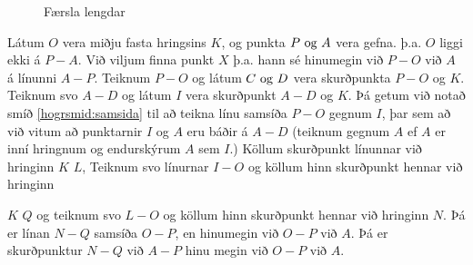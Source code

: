 \begin{frame}
  \begin{figure}[H]
    \centering

    \caption{Færsla lengdar}
    \label{fig:hogrfaerslalengdar}
  \end{figure}
  
\end{frame}

\begin{frame}
  \begin{hogrsmid}[Punktfinnari]\label{hogrsmid:punktfinnari}
    Látum \(O\) vera miðju fasta hringsins \(K\), og punkta \(P \text{ og } A\) vera gefna. þ.a.
    \(O\) liggi ekki á \(P-A\).
    Við viljum finna punkt \(X\) þ.a. hann sé hinumegin við \(P-O\) við \(A\)
    á línunni \(A-P\).
    Teiknum \(P-O\) og látum \(C \text{ og } D\) vera skurðpunkta \(P-O\) og \(K\).
    Teiknum svo \(A-D\) og látum \(I\) vera skurðpunkt \(A-D\) og \(K\).
    Þá getum við notað smíð \ref{hogrsmid:samsida} til
    að teikna línu samsíða \(P-O\) gegnum \(I\), þar sem að við vitum að
    punktarnir \(I\) og \(A\) eru báðir á \(A-D\) (teiknum gegnum \(A\)
    ef \(A\) er inní hringnum og endurskýrum \(A\) sem \(I\).)
    Köllum skurðpunkt línunnar við hringinn \(K\) \(L\),
    Teiknum svo línurnar \(I-O\) og köllum hinn skurðpunkt hennar við hringinn

    \(K\) \(Q\) og teiknum svo \(L-O\) og köllum hinn skurðpunkt hennar við
    hringinn \(N\). Þá er línan \(N-Q\) samsíða \(O-P\), en hinumegin við
    \(O-P\) við \(A\). Þá er skurðpunktur \(N-Q\) við \(A-P\) hinu megin við
    \(O-P\) við \(A\).
  \end{hogrsmid}
\end{frame}

